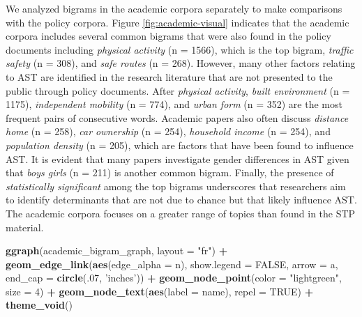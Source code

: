 \documentclass[]{elsarticle} %
\newenvironment{Shaded}{\begin{snugshade}}{\end{snugshade}}
\newcommand{\DataTypeTok}[1]{\textcolor[rgb]{0.13,0.29,0.53}{#1}}
\newcommand{\DecValTok}[1]{\textcolor[rgb]{0.00,0.00,0.81}{#1}}
\newcommand{\KeywordTok}[1]{\textcolor[rgb]{0.13,0.29,0.53}{\textbf{#1}}}
\newcommand{\NormalTok}[1]{#1}
\newcommand{\OperatorTok}[1]{\textcolor[rgb]{0.81,0.36,0.00}{\textbf{#1}}}
\newcommand{\OtherTok}[1]{\textcolor[rgb]{0.56,0.35,0.01}{#1}}
\newcommand{\StringTok}[1]{\textcolor[rgb]{0.31,0.60,0.02}{#1}}
\begin{document}
We analyzed bigrams in the academic corpora separately to make
comparisons with the policy corpora. Figure \ref{fig:academic-visual}
indicates that the academic corpora includes several common bigrams that
were also found in the policy documents including \emph{physical
activity} (n = 1566), which is the top bigram, \emph{traffic safety} (n
= 308), and \emph{safe routes} (n = 268). However, many other factors
relating to AST are identified in the research literature that are not
presented to the public through policy documents. After \emph{physical
activity}, \emph{built environment} (n = 1175), \emph{independent
mobility} (n = 774), and \emph{urban form} (n = 352) are the most
frequent pairs of consecutive words. Academic papers also often discuss
\emph{distance home} (n = 258), \emph{car ownership} (n = 254),
\emph{household income} (n = 254), and \emph{population density} (n =
205), which are factors that have been found to influence AST. It is
evident that many papers investigate gender differences in AST given
that \emph{boys girls} (n = 211) is another common bigram. Finally, the
presence of \emph{statistically significant} among the top bigrams
underscores that researchers aim to identify determinants that are not
due to chance but that likely influence AST. The academic corpora
focuses on a greater range of topics than found in the STP material.

\begin{Shaded}
\begin{Highlighting}[]
\KeywordTok{ggraph}\NormalTok{(academic_bigram_graph, }\DataTypeTok{layout =} \StringTok{"fr"}\NormalTok{) }\OperatorTok{+}
\StringTok{  }\KeywordTok{geom_edge_link}\NormalTok{(}\KeywordTok{aes}\NormalTok{(}\DataTypeTok{edge_alpha =}\NormalTok{ n), }\DataTypeTok{show.legend =} \OtherTok{FALSE}\NormalTok{,}
                 \DataTypeTok{arrow =}\NormalTok{ a, }\DataTypeTok{end_cap =} \KeywordTok{circle}\NormalTok{(.}\DecValTok{07}\NormalTok{, }\StringTok{'inches'}\NormalTok{)) }\OperatorTok{+}
\StringTok{  }\KeywordTok{geom_node_point}\NormalTok{(}\DataTypeTok{color =} \StringTok{"lightgreen"}\NormalTok{, }\DataTypeTok{size =} \DecValTok{4}\NormalTok{) }\OperatorTok{+}
\StringTok{  }\KeywordTok{geom_node_text}\NormalTok{(}\KeywordTok{aes}\NormalTok{(}\DataTypeTok{label =}\NormalTok{ name), }\DataTypeTok{repel =} \OtherTok{TRUE}\NormalTok{) }\OperatorTok{+}\StringTok{ }
\StringTok{  }\KeywordTok{theme_void}\NormalTok{()}
\end{Highlighting}
\end{Shaded}
\end{document}
